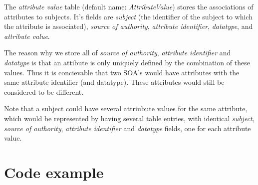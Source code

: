 \documentclass[10pt,a4paper]{article}
\begin{document}
The \emph{attribute value} table (default name: \emph{AttributeValue}) stores
the associations of attributes to subjects. It's fields are \emph{subject} 
(the identifier of the subject to which the attribute is associated), 
\emph{source of authority}, \emph{attribute identifier}, \emph{datatype},
and \emph{attribute value}.

The reason why we store all of \emph{source of authority}, \emph{attribute 
identifier} and \emph{datatype} is that an attibute is only uniquely defined 
by the combination of these values. Thus it is concievable that two SOA's would
have attributes with the same attribute identifier (and datatype). These
attributes would still be considered to be different.

Note that a subject could have several attriubute values for the same 
attribute, which would be represented by having several table entries, with 
identical \emph{subject}, \emph{source of authority}, \emph{attribute 
identifier} and \emph{datatype} fields, one for each attribute value.


\section{Code example}
\end{document}
